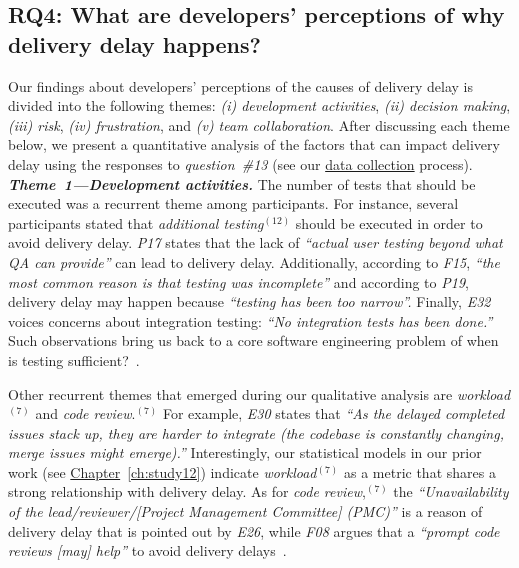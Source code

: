 \subsection*{\textbf{RQ4: What are developers' perceptions of why
		delivery delay happens? }}

\begin{sloppypar}
Our findings about developers' perceptions of the causes of delivery delay is
divided into the following themes: {\em (i) development activities}, {\em (ii)
decision making}, {\em (iii) risk}, {\em (iv) frustration}, and {\em (v) team
collaboration}. After discussing each theme below, we present a quantitative
analysis of the factors that can impact delivery delay using the responses to
{\em question~\#13} (see our \hyperref[ch5:datacollection2]{data collection}
process).\\ 

\noindent\textit{\textbf{Theme~1---Development activities.}} 
The number of tests that should be executed was a recurrent theme among
participants. For instance, several participants stated that {\em additional
testing}$^{(12)}$ should be executed in order to avoid delivery delay. {\em
P17} states that the lack of {\em ``actual user testing beyond what QA can
provide''} can lead to delivery delay. Additionally, according to {\em F15},
{\em ``the most common reason is that testing was incomplete''} and according to {\em
P19}, delivery delay may happen because {\em ``testing has been too
narrow''.} Finally, {\em E32} voices concerns about integration testing: {\em
``No integration tests has been done.''} Such observations bring us back to a
core software engineering problem of when is testing
sufficient?~\cite{beller2015much,alghamdi2016automated}.

Other recurrent themes that emerged during our qualitative analysis are {\em
workload}$^{(7)}$ and {\em code review}.$^{(7)}$ For example, {\em E30} states
that {\em ``As the delayed completed issues stack up, they are harder to
integrate (the codebase is constantly changing, merge issues might emerge).''}
Interestingly, our statistical models in our prior work (see
\hyperref[ch:study12]{Chapter}~\ref{ch:study12})
indicate {\em workload}$^{(7)}$ as a metric that shares a strong relationship
with delivery delay. As for {\em code review},$^{(7)}$ the {\em
``Unavailability of the lead/reviewer/[Project Management Committee] (PMC)''} is
a reason of delivery delay that is pointed out by {\em E26}, while {\em F08}
argues that a {\em ``prompt code reviews [may] help''} to avoid delivery
delays~\cite{mcintosh2016emse}.\\


\end{sloppypar}
